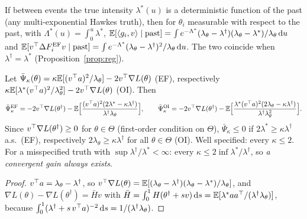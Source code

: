 \begin{lemma}\label{lem:m-gap}\Pt{}
If between events the true intensity $\lambda^*(u)$ is a deterministic function of the past (any multi-exponential Hawkes truth), then for $\theta_i$ measurable with respect to the past, with $\Lambda^*(u)=\int_0^u\lambda^*$,
$\mathbb{E}[\langle g_i,v\rangle\mid\text{past}]=\int e^{-\Lambda^*}(\lambda_\theta-\lambda^\dagger)(\lambda_\theta-\lambda^*)/\lambda_\theta\,\mathrm d u$ and $\mathbb{E}[v^{\top}\Delta F^{\mathrm{EF}}_iv\mid\text{past}]=\int e^{-\Lambda^*}(\lambda_\theta-\lambda^\dagger)^2/\lambda_\theta\,\mathrm d u$. The two coincide when $\lambda^\dagger=\lambda^*$ (Proposition~\ref{prop:reg}).
\end{lemma}

\begin{lemma}\label{lem:m-drift}\Pt{}
Let $\bar\Psi_\kappa(\theta)=\kappa\mathbb{E}[(v^{\top} a)^2/\lambda_\theta]-2v^{\top}\nabla L(\theta)$ (EF), respectively $\kappa\mathbb{E}[\lambda^*(v^{\top} a)^2/\lambda_\theta^2]-2v^{\top}\nabla L(\theta)$ (OI). Then
\[
\bar\Psi^{\mathrm{EF}}_\kappa=-2v^{\top}\nabla L(\theta^\dagger)-\mathbb{E}\Big[\frac{(v^{\top} a)^2(2\lambda^*-\kappa\lambda^\dagger)}{\lambda^\dagger\lambda_\theta}\Big],\qquad
\bar\Psi^{\mathrm{OI}}_\kappa=-2v^{\top}\nabla L(\theta^\dagger)-\mathbb{E}\Big[\frac{\lambda^*(v^{\top} a)^2(2\lambda_\theta-\kappa\lambda^\dagger)}{\lambda^\dagger\lambda_\theta^2}\Big].
\]
Since $v^{\top}\nabla L(\theta^\dagger)\ge0$ for $\theta\in\Theta$ (first-order condition on $\Theta$), $\bar\Psi_\kappa\le0$ if $2\lambda^*\ge\kappa\lambda^\dagger$ a.s.\ (EF), respectively $2\lambda_\theta\ge\kappa\lambda^\dagger$ for all $\theta\in\Theta$ (OI). Well specified: every $\kappa\le2$. For a misspecified truth with $\sup\lambda^\dagger/\lambda^*<\infty$: every $\kappa\le2\inf\lambda^*/\lambda^\dagger$, so \emph{a convergent gain always exists}.
\end{lemma}
\begin{proof}
$v^{\top} a=\lambda_\theta-\lambda^\dagger$, so $v^{\top}\nabla L(\theta)=\mathbb{E}[(\lambda_\theta-\lambda^\dagger)(\lambda_\theta-\lambda^*)/\lambda_\theta]$, and $\nabla L(\theta)-\nabla L(\theta^\dagger)=\bar Hv$ with $\bar H=\int_0^1H(\theta^\dagger+sv)\,\mathrm d s=\mathbb{E}[\lambda^*aa^{\top}/(\lambda^\dagger\lambda_\theta)]$, because $\int_0^1(\lambda^\dagger+s\,v^{\top} a)^{-2}\,\mathrm d s=1/(\lambda^\dagger\lambda_\theta)$.
\end{proof}

